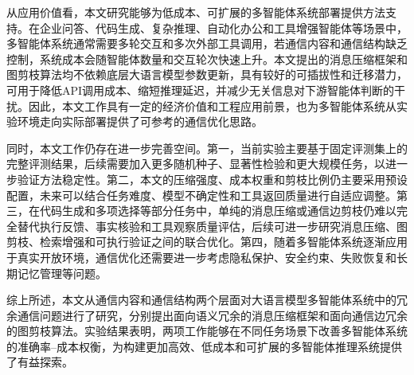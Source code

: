 \begin{conclusion}
从应用价值看，本文研究能够为低成本、可扩展的多智能体系统部署提供方法支持。在企业问答、代码生成、复杂推理、自动化办公和工具增强智能体等场景中，多智能体系统通常需要多轮交互和多次外部工具调用，若通信内容和通信结构缺乏控制，系统成本会随智能体数量和交互轮次快速上升。本文提出的消息压缩框架和图剪枝算法均不依赖底层大语言模型参数更新，具有较好的可插拔性和迁移潜力，可用于降低API调用成本、缩短推理延迟，并减少无关信息对下游智能体判断的干扰。因此，本文工作具有一定的经济价值和工程应用前景，也为多智能体系统从实验环境走向实际部署提供了可参考的通信优化思路。

同时，本文工作仍存在进一步完善空间。第一，当前实验主要基于固定评测集上的完整评测结果，后续需要加入更多随机种子、显著性检验和更大规模任务，以进一步验证方法稳定性。第二，本文的压缩强度、成本权重和剪枝比例仍主要采用预设配置，未来可以结合任务难度、模型不确定性和工具返回质量进行自适应调整。第三，在代码生成和多项选择等部分任务中，单纯的消息压缩或通信边剪枝仍难以完全替代执行反馈、事实核验和工具观察质量评估，后续可进一步研究消息压缩、图剪枝、检索增强和可执行验证之间的联合优化。第四，随着多智能体系统逐渐应用于真实开放环境，通信优化还需要进一步考虑隐私保护、安全约束、失败恢复和长期记忆管理等问题。

综上所述，本文从通信内容和通信结构两个层面对大语言模型多智能体系统中的冗余通信问题进行了研究，分别提出面向语义冗余的消息压缩框架和面向通信边冗余的图剪枝算法。实验结果表明，两项工作能够在不同任务场景下改善多智能体系统的准确率--成本权衡，为构建更加高效、低成本和可扩展的多智能体推理系统提供了有益探索。

\end{conclusion}
